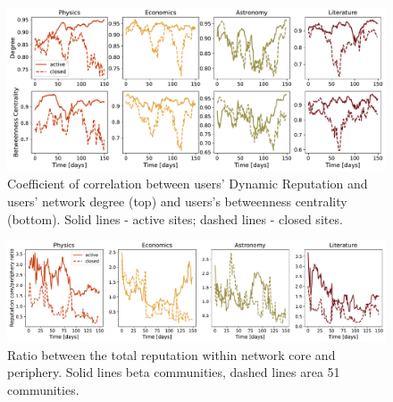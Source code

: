 \begin{figure}[h!]
	\centering
	\includegraphics[width=\linewidth]{figures/stackexchange/correlations.pdf}
	\caption{Coefficient of correlation between users' Dynamic Reputation and users' network degree (top) and users's betweenness centrality (bottom). Solid lines - active sites; dashed lines - closed sites.}
	\label{fig:dyn_rep_centrality}
\end{figure}

\begin{figure}[h!]
	\centering
	\includegraphics[width=\linewidth]{figures/stackexchange/core_per_ratio_reputation.pdf}
	\caption{Ratio between the total reputation within network core and periphery. Solid lines beta communities, dashed lines area 51 communities.}
	\label{fig:dr_core_per}
\end{figure}


